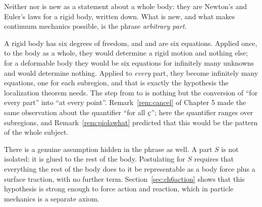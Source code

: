 \begin{remark}\label{rem:ch6everypart}
Neither  nor  is new as a statement about a whole
body: they are Newton's and Euler's laws for a rigid body, written
down. What is new, and what makes continuum mechanics possible, is the
phrase \emph{arbitrary part}.

A rigid body has six degrees of freedom, and  and 
are six equations. Applied once, to the body as a whole, they would
determine a rigid motion and nothing else; for a deformable body they
would be six equations for infinitely many unknowns and would determine
nothing. Applied to \emph{every} part, they become infinitely many
equations, one for each subregion, and that is exactly the hypothesis
the localization theorem needs. The step from  to 
is nothing but the conversion of ``for every part'' into ``at every
point''. Remark~\ref{rem:cancel} of Chapter 5 made the same observation
about the quantifier ``for all $\bc$''; here the quantifier ranges over
subregions, and Remark~\ref{rem:piolawhat} predicted that this would be
the pattern of the whole subject.

There is a genuine assumption hidden in the phrase as well. A part $S$
is not isolated: it is glued to the rest of the body. Postulating
 for $S$ requires that everything the rest of the body does
to it be representable as a body force plus a surface traction, with no
further term. Section~\ref{sec:ch6action} shows that this hypothesis is
strong enough to force action and reaction, which in particle mechanics
is a separate axiom.
\end{remark}

